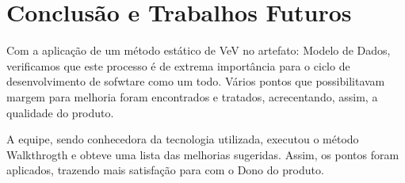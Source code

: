 \chapter[Conclusão e Trabalhos Furutos]{Conclusão e Trabalhos Futuros}

Com a aplicação de um método estático de VeV no artefato: Modelo de Dados, verificamos
que este processo é de extrema importância para o ciclo de desenvolvimento de sofwtare
como um todo. Vários pontos que possibilitavam margem para melhoria foram encontrados
e tratados, acrecentando, assim, a qualidade do produto.

A equipe, sendo conhecedora da tecnologia utilizada, executou o método Walkthrogth
e obteve uma lista das melhorias sugeridas. Assim, os pontos foram aplicados, trazendo
mais satisfação para com o Dono do produto.
